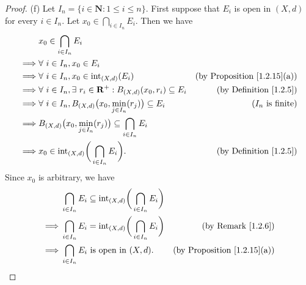 \begin{proof}{(f)}
    Let \(I_n = \{i \in \mathbf{N} : 1 \leq i \leq n\}\).
    First suppose that \(E_i\) is open in \((X, d)\) for every \(i \in I_n\).
    Let \(x_0 \in \bigcap_{i \in I_n} E_i\).
    Then we have
    \begin{align*}
                 & x_0 \in \bigcap_{i \in I_n} E_i                                                                                                  \\
        \implies & \forall\ i \in I_n, x_0 \in E_i                                                                                                  \\
        \implies & \forall\ i \in I_n, x_0 \in \text{int}_{(X, d)}(E_i)                                   & \text{(by Proposition \ref{1.2.15}(a))} \\
        \implies & \forall\ i \in I_n, \exists\ r_i \in \mathbf{R}^+ : B_{(X, d)}(x_0, r_i) \subseteq E_i & \text{(by Definition \ref{1.2.5})}      \\
        \implies & \forall\ i \in I_n, B_{(X, d)}\big(x_0, \min_{j \in I_n}(r_j)\big) \subseteq E_i       & \text{(\(I_n\) is finite)}              \\
        \implies & B_{(X, d)}\big(x_0, \min_{j \in I_n}(r_j)\big) \subseteq \bigcap_{i \in I_n} E_i                                                 \\
        \implies & x_0 \in \text{int}_{(X, d)}\bigg(\bigcap_{i \in I_n} E_i\bigg).                        & \text{(by Definition \ref{1.2.5})}
    \end{align*}
    Since \(x_0\) is arbitrary, we have
    \begin{align*}
                 & \bigcap_{i \in I_n} E_i \subseteq \text{int}_{(X, d)}\bigg(\bigcap_{i \in I_n} E_i\bigg)                                           \\
        \implies & \bigcap_{i \in I_n} E_i = \text{int}_{(X, d)}\bigg(\bigcap_{i \in I_n} E_i\bigg)         & \text{(by Remark \ref{1.2.6})}          \\
        \implies & \bigcap_{i \in I_n} E_i \text{ is open in } (X, d).                                      & \text{(by Proposition \ref{1.2.15}(a))}
    \end{align*}


\end{proof}
